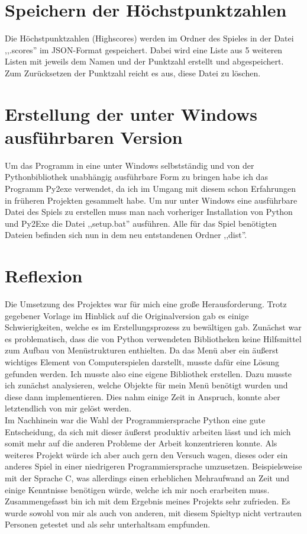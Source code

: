 \documentclass[hidelinks]{article}
\begin{document}
\section{Speichern der Höchstpunktzahlen}
Die Höchstpunktzahlen (Highscores) werden im Ordner des Spieles in der Datei ,,.scores'' im JSON-Format gespeichert. Dabei wird eine Liste aus 5 weiteren Listen mit jeweils dem Namen und der Punktzahl erstellt und abgespeichert. Zum Zurücksetzen der Punktzahl reicht es aus, diese Datei zu löschen.

\section{Erstellung der unter Windows ausführbaren Version}
Um das Programm in eine unter Windows selbstständig und von der Pythonbibliothek unabhängig ausführbare Form zu bringen habe ich das Programm Py2exe verwendet, da ich im Umgang mit diesem schon Erfahrungen in früheren Projekten gesammelt habe. Um nur unter Windows eine ausführbare Datei des Spiels zu erstellen muss man nach vorheriger Installation von Python und Py2Exe die Datei ,,setup.bat'' ausführen. Alle für das Spiel benötigten Dateien befinden sich nun in dem neu entstandenen Ordner ,,dist''.

\section{Reflexion}
Die Umsetzung des Projektes war für mich eine große Herausforderung. Trotz gegebener Vorlage im Hinblick auf die Originalversion gab es einige Schwierigkeiten, welche es im Erstellungsprozess zu bewältigen gab. Zunächst war es problematisch, dass die von Python verwendeten Bibliotheken keine Hilfsmittel zum Aufbau von Menüstrukturen enthielten. Da das Menü aber ein äußerst wichtiges Element von Computerspielen darstellt, musste dafür eine Lösung gefunden werden. Ich musste also eine eigene Bibliothek erstellen. Dazu musste ich zunächst analysieren, welche Objekte für mein Menü benötigt wurden und diese dann implementieren. Dies nahm einige Zeit in Anspruch, konnte aber letztendlich von mir gelöst werden.\\
Im Nachhinein war die Wahl der Programmiersprache Python eine gute Entscheidung, da sich mit dieser äußerst produktiv arbeiten lässt und ich mich somit mehr auf die anderen Probleme der Arbeit konzentrieren konnte. Als weiteres Projekt würde ich aber auch gern den Versuch wagen, dieses oder ein anderes Spiel in einer niedrigeren Programmiersprache umzusetzen. Beispielsweise mit der Sprache C, was allerdings einen erheblichen Mehraufwand an Zeit und einige Kenntnisse benötigen würde, welche ich mir noch erarbeiten muss.\\ 
Zusammengefasst bin ich mit dem Ergebnis meines Projekts sehr zufrieden. Es wurde sowohl von mir als auch von anderen, mit diesem Spieltyp nicht vertrauten Personen getestet und als sehr unterhaltsam empfunden. 
\end{document}
